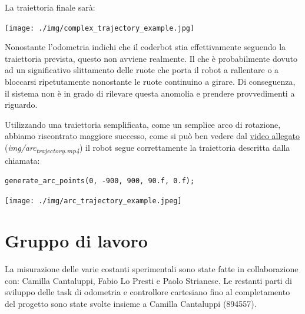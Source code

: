 \documentclass[11pt]{article}
\begin{document}
La traiettoria finale sarà:
\begin{center}
\texttt{[image: ./img/complex\_trajectory\_example.jpg]}
\end{center}

Nonostante l'odometria indichi che il coderbot stia effettivamente seguendo la traiettoria prevista, questo non avviene realmente.
Il che è probabilmente dovuto ad un significativo slittamento delle ruote che porta il robot a rallentare o a bloccarsi ripetutamente nonostante le ruote continuino a girare. Di conseguenza, il sistema non è in grado di rilevare questa anomolia e prendere provvedimenti a riguardo.

Utilizzando una traiettoria semplificata, come un semplice arco di rotazione, abbiamo riscontrato maggiore successo, come si può ben vedere dal \href{./img/arc\_trajectory.mp4}{video allegato} (\emph{img/arc\textsubscript{trajectory.mp4}}) il robot segue correttamente la traiettoria descritta dalla chiamata:
\begin{verbatim}
generate_arc_points(0, -900, 900, 90.f, 0.f);
\end{verbatim}
\begin{center}
\texttt{[image: ./img/arc\_trajectory\_example.jpeg]}
\end{center}
\section{Gruppo di lavoro}
\label{sec:orga32bfa3}
La misurazione delle varie costanti sperimentali sono state fatte in collaborazione con: Camilla Cantaluppi, Fabio Lo Presti e Paolo Strianese.
Le restanti parti di sviluppo delle task di odometria e controllore cartesiano fino al completamento del progetto sono state svolte insieme a Camilla Cantaluppi (894557).
\end{document}
